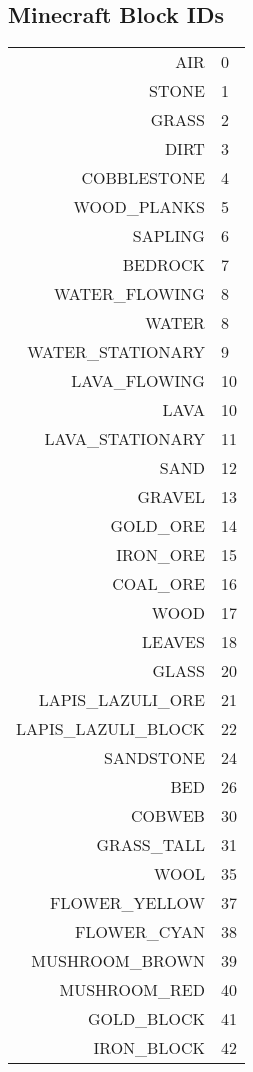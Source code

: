 	\begin{appendices}
		
		\section{Minecraft Block IDs} \label{sec:blockids}
			
			\ifprint
				\scriptsize
			\else
				\tiny
			\fi
			\begin{tabular}{rl}
				AIR & 0 \\
				STONE & 1 \\
				GRASS & 2 \\
				DIRT & 3 \\
				COBBLESTONE & 4 \\
				WOOD\_PLANKS & 5 \\
				SAPLING & 6 \\
				BEDROCK & 7 \\
				WATER\_FLOWING & 8 \\
				WATER & 8 \\
				WATER\_STATIONARY & 9 \\
				LAVA\_FLOWING & 10 \\
				LAVA & 10 \\
				LAVA\_STATIONARY & 11 \\
				SAND & 12 \\
				GRAVEL & 13 \\
				GOLD\_ORE & 14 \\
				IRON\_ORE & 15 \\
				COAL\_ORE & 16 \\
				WOOD & 17 \\
				LEAVES & 18 \\
				GLASS & 20 \\
				LAPIS\_LAZULI\_ORE & 21 \\
				LAPIS\_LAZULI\_BLOCK & 22 \\
				SANDSTONE & 24 \\
				BED & 26 \\
				COBWEB & 30 \\
				GRASS\_TALL & 31 \\
				WOOL & 35 \\
				FLOWER\_YELLOW & 37 \\
				FLOWER\_CYAN & 38 \\
				MUSHROOM\_BROWN & 39 \\
				MUSHROOM\_RED & 40 \\
				GOLD\_BLOCK & 41 \\
				IRON\_BLOCK & 42 \\

\end{tabular}
\end{appendices}

